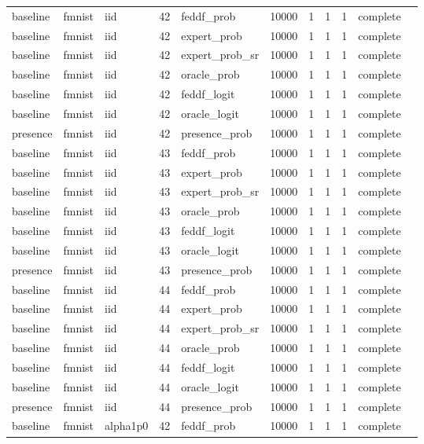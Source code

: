 \begin{tabular}{lllrlrrrrll}
baseline & fmnist & iid & 42 & feddf\_prob & 10000 & 1 & 1 & 1 & complete &  \\
baseline & fmnist & iid & 42 & expert\_prob & 10000 & 1 & 1 & 1 & complete &  \\
baseline & fmnist & iid & 42 & expert\_prob\_sr & 10000 & 1 & 1 & 1 & complete &  \\
baseline & fmnist & iid & 42 & oracle\_prob & 10000 & 1 & 1 & 1 & complete &  \\
baseline & fmnist & iid & 42 & feddf\_logit & 10000 & 1 & 1 & 1 & complete &  \\
baseline & fmnist & iid & 42 & oracle\_logit & 10000 & 1 & 1 & 1 & complete &  \\
presence & fmnist & iid & 42 & presence\_prob & 10000 & 1 & 1 & 1 & complete &  \\
baseline & fmnist & iid & 43 & feddf\_prob & 10000 & 1 & 1 & 1 & complete &  \\
baseline & fmnist & iid & 43 & expert\_prob & 10000 & 1 & 1 & 1 & complete &  \\
baseline & fmnist & iid & 43 & expert\_prob\_sr & 10000 & 1 & 1 & 1 & complete &  \\
baseline & fmnist & iid & 43 & oracle\_prob & 10000 & 1 & 1 & 1 & complete &  \\
baseline & fmnist & iid & 43 & feddf\_logit & 10000 & 1 & 1 & 1 & complete &  \\
baseline & fmnist & iid & 43 & oracle\_logit & 10000 & 1 & 1 & 1 & complete &  \\
presence & fmnist & iid & 43 & presence\_prob & 10000 & 1 & 1 & 1 & complete &  \\
baseline & fmnist & iid & 44 & feddf\_prob & 10000 & 1 & 1 & 1 & complete &  \\
baseline & fmnist & iid & 44 & expert\_prob & 10000 & 1 & 1 & 1 & complete &  \\
baseline & fmnist & iid & 44 & expert\_prob\_sr & 10000 & 1 & 1 & 1 & complete &  \\
baseline & fmnist & iid & 44 & oracle\_prob & 10000 & 1 & 1 & 1 & complete &  \\
baseline & fmnist & iid & 44 & feddf\_logit & 10000 & 1 & 1 & 1 & complete &  \\
baseline & fmnist & iid & 44 & oracle\_logit & 10000 & 1 & 1 & 1 & complete &  \\
presence & fmnist & iid & 44 & presence\_prob & 10000 & 1 & 1 & 1 & complete &  \\
baseline & fmnist & alpha1p0 & 42 & feddf\_prob & 10000 & 1 & 1 & 1 & complete &  \\

\end{tabular}
